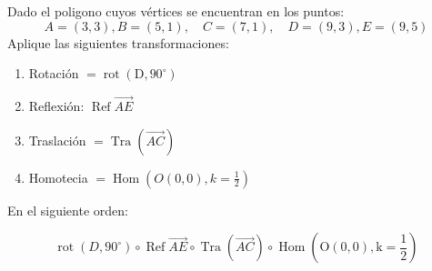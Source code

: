 \begin{problema}
	Dado el poligono cuyos vértices se encuentran en los puntos:
	$$
	A=(3,3), B=(5,1), \quad C=(7,1), \quad D=(9,3), E=(9,5)
	$$
	Aplique las siguientes transformaciones: 
	\begin{enumerate}
		\item Rotación $=\operatorname{rot}\left(\mathrm{D}, 90^{\circ}\right)$
		\item Reflexión: $\operatorname{Ref} \overrightarrow{A E}$
	    \item Traslación $=\operatorname{Tra}(\overrightarrow{A C})$
	    \item Homotecia $=\operatorname{Hom}\left(O(0,0), k=\frac{1}{2}\right)$
	\end{enumerate}

	En el siguiente orden:
	
	$$
	\operatorname{rot}\left(D, 90^{\circ}\right) \circ \operatorname{Ref} \overrightarrow{A E} \circ \operatorname{Tra}(\overrightarrow{A C}) \circ \operatorname{Hom}\left(\mathrm{O}(0,0), \mathrm{k}=\frac{1}{2}\right)
	$$
\end{problema}

